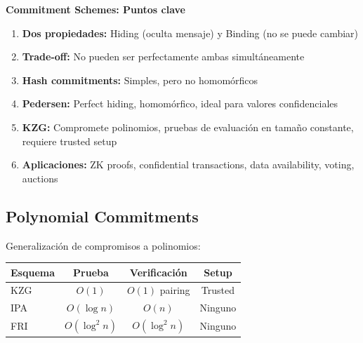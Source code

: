 \documentclass[11pt,a4paper,twoside,openright]{book}
\theoremstyle{definition}
\theoremstyle{plain}
\theoremstyle{remark}
\begin{document}
\begin{keyidea}
\textbf{Commitment Schemes: Puntos clave}

\begin{enumerate}
    \item \textbf{Dos propiedades:} Hiding (oculta mensaje) y Binding (no se puede cambiar)
    
    \item \textbf{Trade-off:} No pueden ser perfectamente ambas simultáneamente
    
    \item \textbf{Hash commitments:} Simples, pero no homomórficos
    
    \item \textbf{Pedersen:} Perfect hiding, homomórfico, ideal para valores confidenciales
    
    \item \textbf{KZG:} Compromete polinomios, pruebas de evaluación en tamaño constante, requiere trusted setup
    
    \item \textbf{Aplicaciones:} ZK proofs, confidential transactions, data availability, voting, auctions
\end{enumerate}
\end{keyidea}


\subsection{Polynomial Commitments}

Generalización de compromisos a polinomios:

\begin{table}[htbp]
\centering
\begin{tabular}{lccc}
\toprule
\textbf{Esquema} & \textbf{Prueba} & \textbf{Verificación} & \textbf{Setup} \\
\midrule
KZG & $O(1)$ & $O(1)$ pairing & Trusted \\
IPA & $O(\log n)$ & $O(n)$ & Ninguno \\
FRI & $O(\log^2 n)$ & $O(\log^2 n)$ & Ninguno \\
\bottomrule
\end{tabular}
\end{table}
\end{document}
